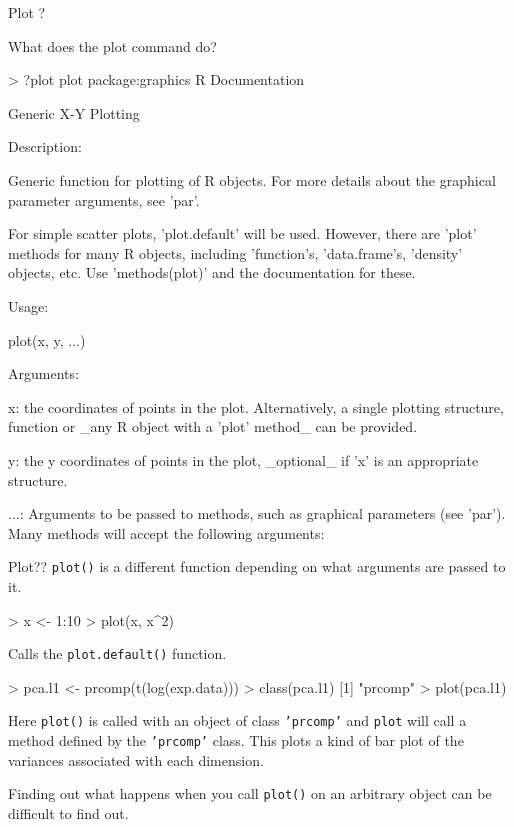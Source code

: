 \documentclass[pdf]{beamer}
\begin{document}
\begin{frame}[fragile]{Plot ?}

  \small What does the plot command do?
  \begin{rcode}
    > ?plot
    plot                 package:graphics                  R Documentation

    Generic X-Y Plotting

    Description:

    Generic function for plotting of R objects.  For more details
    about the graphical parameter arguments, see 'par'.

    For simple scatter plots, 'plot.default' will be used.  However,
    there are 'plot' methods for many R objects, including
    'function's, 'data.frame's, 'density' objects, etc.  Use
    'methods(plot)' and the documentation for these.
    
    Usage:

     plot(x, y, ...)
     
    Arguments:

       x: the coordinates of points in the plot. Alternatively, a
          single plotting structure, function or _any R object with a
          'plot' method_ can be provided.

       y: the y coordinates of points in the plot, _optional_ if 'x' is
          an appropriate structure.

     ...: Arguments to be passed to methods, such as graphical
          parameters (see 'par').  Many methods will accept the
          following arguments:
          
  \end{rcode}
\end{frame}

\begin{frame}[fragile]{Plot??}
  \texttt{plot()} is a different function depending on what arguments
  are passed to it.

  \begin{rcode}
    > x <- 1:10
    > plot(x, x^2)
  \end{rcode}
  \small Calls the \texttt{plot.default()} function.

  \begin{rcode}
    > pca.l1 <- prcomp(t(log(exp.data)))
    > class(pca.l1)
    [1] "prcomp"
    > plot(pca.l1)
  \end{rcode}

  {\small
  Here \texttt{plot()} is called with an object of class \texttt{'prcomp'}
  and \texttt{plot} will call a method defined by the \texttt{'prcomp'} class.
  This plots a kind of bar plot of the variances associated with
  each dimension.
  
  Finding out what happens when you call \texttt{plot()} on an arbitrary
  object can be difficult to find out.
}
\end{frame}
\end{document}
